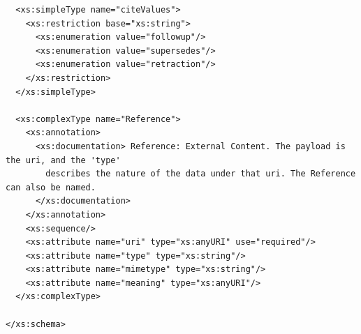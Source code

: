 \documentclass[11pt,a4paper]{ivoa}
\begin{document}
{\begin{verbatim}
  <xs:simpleType name="citeValues">
    <xs:restriction base="xs:string">
      <xs:enumeration value="followup"/>
      <xs:enumeration value="supersedes"/>
      <xs:enumeration value="retraction"/>
    </xs:restriction>
  </xs:simpleType>

  <xs:complexType name="Reference">
    <xs:annotation>
      <xs:documentation> Reference: External Content. The payload is the uri, and the 'type'
        describes the nature of the data under that uri. The Reference can also be named.
      </xs:documentation>
    </xs:annotation>
    <xs:sequence/>
    <xs:attribute name="uri" type="xs:anyURI" use="required"/>
    <xs:attribute name="type" type="xs:string"/>
    <xs:attribute name="mimetype" type="xs:string"/>
    <xs:attribute name="meaning" type="xs:anyURI"/>
  </xs:complexType>

</xs:schema>
\end{verbatim}}
\end{document}
